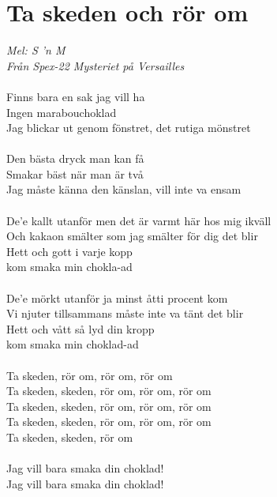\documentclass[a5paper,15pt]{article}
\begin{document}
\section{Ta skeden och rör om}
\emph{Mel: S 'n M\\
Från Spex-22 Mysteriet på Versailles}\\
\\
Finns bara en sak jag vill ha\\
Ingen marabouchoklad\\
Jag blickar ut genom fönstret, det rutiga mönstret\\
\\
Den bästa dryck man kan få\\
Smakar bäst när man är två\\
Jag måste känna den känslan, vill inte va ensam\\
\\
De’e kallt utanför men det är varmt här hos mig ikväll\\
Och kakaon smälter som jag smälter för dig det blir\\
Hett och gott i varje kopp\\
kom smaka min chokla-ad\\
\\
De’e mörkt utanför ja minst åtti procent kom\\
Vi njuter tillsammans måste inte va tänt det blir\\
Hett och vått så lyd din kropp\\
kom smaka min choklad-ad\\
\\
Ta skeden, rör om, rör om, rör om\\
Ta skeden, skeden, rör om, rör om, rör om\\
Ta skeden, skeden, rör om, rör om, rör om\\
Ta skeden, skeden, rör om, rör om, rör om\\
Ta skeden, skeden, rör om\\
\\
Jag vill bara smaka din choklad!\\
Jag vill bara smaka din choklad!\\
\\
\end{document}
